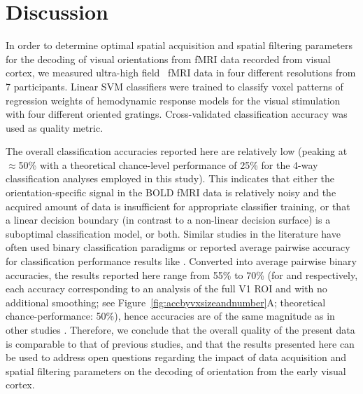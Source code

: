 \section*{Discussion}

\noindent In order to determine optimal spatial acquisition and spatial filtering
parameters for the decoding of visual orientations from fMRI data recorded from
visual cortex, we measured ultra-high field \sevenT\ fMRI data in four
different resolutions from 7 participants. Linear SVM classifiers were trained
to classify voxel patterns of regression weights of hemodynamic response models
for the visual stimulation with four different oriented gratings.
Cross-validated classification accuracy was used as quality metric.

The overall classification accuracies reported here are relatively low (peaking
at $\approx$50\% with a theoretical chance-level performance of 25\% for the
4-way classification analyses employed in this study). This indicates that
either the orientation-specific signal in the BOLD fMRI data is relatively
noisy and the acquired amount of data is insufficient for appropriate
classifier training, or that a linear decision boundary (in contrast to a
non-linear decision surface) is a suboptimal classification model, or both.
Similar studies in the literature have often used binary classification
paradigms \citep[for example,][]{alink_2013, chaimow_2011} or reported average
pairwise accuracy for classification performance results like \citep[e.g.,
][]{kamitani_2005,opdebeeck_2010}. Converted into average pairwise binary
accuracies, the results reported here range from 55\% to 70\% (for  and
 respectively, each accuracy corresponding to an analysis of the full V1
ROI and with no additional smoothing; see
Figure~\ref{fig:accbyvxsizeandnumber}A; theoretical chance-performance: 50\%),
hence accuracies are of the same magnitude as in other studies \citep[see, for
example, ][]{haynes_2005,alink_2013}. Therefore, we conclude that the overall
quality of the present data is comparable to that of previous studies, and that
the results presented here can be used to address open questions regarding the
impact of data acquisition and spatial filtering parameters on the decoding of
orientation from the early visual cortex.

